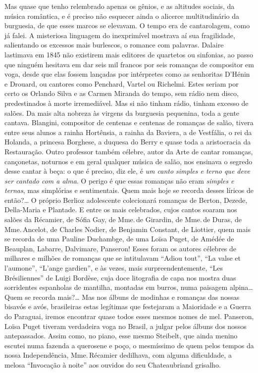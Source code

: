 Mas quase que tenho relembrado apenas os gênios, e as altitudes sociais,
da música romântica, e é preciso não esquecer ainda o alicerce
multitudinário da burguesia, de que esses marcos se elevavam. O tempo
era de cantarolagem, como já falei. A misteriosa linguagem do
inexprimível mostrava aí sua fragilidade, salientando os excessos mais
burlescos, o romance com palavras. Dalaire lastimava em 1845 não
existirem mais editores de quartetos ou sinfonias, ao passo que ninguém
hesitava em dar seis mil francos por seis romanças de compositor em
voga, desde que elas fossem lançadas por intérpretes como as senhoritas
D'Hénin e Drouard, ou cantores como Penchard, Vartel ou Richelmi. Estes
seriam por certo os Orlando Silva e as Carmen Miranda do tempo, sem
rádio nem disco, predestinados à morte irremediável. Mas si não tinham
rádio, tinham excesso de salões. Da mais alta nobreza às virgens da
burguesia pequenina, toda a gente cantava. Blangini, compositor de
centenas e centenas de romanças de salão, tivera entre seus alunos a
rainha Hortênsia, a rainha da Baviera, a de Vestfália, o rei da Holanda,
a princesa Borghese, a duquesa do Berry e quase toda a aristocracia da
Restauração. Outro professor também célebre, autor da Arte de cantar
romanças, cançonetas, noturnos e em geral qualquer música de salão, nos
ensinava o segredo desse cantar à beça: o que é preciso, diz ele, é \textit{um
canto simples e terno que deve ser cantado com a alma}. O perigo é que
essas romanças não eram \textit{simples e ternas}, mas simplórias e
sentimentais. Quem mais hoje se recorda desses líricos de então?\ldots{} O
próprio Berlioz adolescente colecionará romanças de Berton, Dezede,
Della-Maria e Plantade. E entre os mais celebrados, cujos cantos soaram
nos salões da Récamier, de Sófia Gay, de Mme.\,de Girardin, de Mme.\,de
Duras, de Mme.\,Ancelot, de Charles Nodier, de Benjamin Constant, de
Liottier, quem mais se recorda de uma Pauline Duchambge, de uma Loïsa
Puget, de Amédée de Beauplan, Labarre, Dalvimare, Panseron! Esses foram
os autores célebres de milhares e milhões de romanças que se intitulavam
``Adiou tout'', ``La valse et l'aumone'', ``L'ange gardien'', e às
vezes, mais surpreendentemente, ``Les Brésiliennes'' de Luigi Bordèse,
cuja doce litografia de capa nos mostra duas sorridentes espanholas de
mantilha, montadas em burros, numa paisagem alpina\ldots{} Quem se recorda
mais?\ldots{} Mas nos álbuns de modinhas e romanças das nossas bisavós e
avós, brasileiras estas legítimas que festejaram a Maioridade e a Guerra
do Paraguai, iremos encontrar quase todos esses mesmos nomes de mel.
Panseron, Loïsa Puget tiveram verdadeira voga no Brasil, a julgar pelos
álbuns dos nossos antepassados. Assim como, no piano, esse mesmo
Steibelt, que ainda menino escutei numa fazenda a querosene e poço, o
mesmíssimo de quem pelos tempos da nossa Independência, Mme.\,Récamier
dedilhava, com alguma dificuldade, a melosa ``Invocação à noite'' aos
ouvidos do seu Chateaubriand grisalho.

